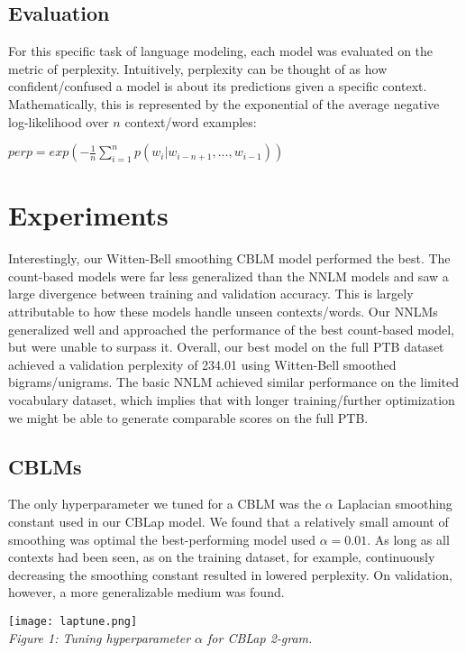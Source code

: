 \documentclass[11pt]{article}
\begin{document}
\subsection{Evaluation}
For this specific task of language modeling, each model was evaluated on the metric of perplexity. Intuitively, perplexity can be thought of as how confident/confused a model is about its predictions given a specific context. Mathematically, this is represented by the exponential of the average negative log-likelihood over $n$ context/word examples:
\begin{center}
    $perp = exp(-\frac{1}{n}\sum_{i=1}^{n} p(w_{\scriptscriptstyle i}|w_{\scriptscriptstyle i-n+1},...,w_{\scriptscriptstyle i-1}))$
\end{center}

\section{Experiments}

Interestingly, our Witten-Bell smoothing CBLM model performed the best. The count-based models were far less generalized than the NNLM models and saw a large divergence between training and validation accuracy. This is largely attributable to how these models handle unseen contexts/words. Our NNLMs generalized well and approached the performance of the best count-based model, but were unable to surpass it. Overall, our best model on the full PTB dataset achieved a validation perplexity of 234.01 using Witten-Bell smoothed bigrams/unigrams. The basic NNLM achieved similar performance on the limited vocabulary dataset, which implies that with longer training/further optimization we might be able to generate comparable scores on the full PTB.

\subsection{CBLMs}
The only hyperparameter we tuned for a CBLM was the $\alpha$ Laplacian smoothing constant used in our CBLap model. We found that a relatively small amount of smoothing was optimal \textemdash  the best-performing model used $\alpha = 0.01$. As long as all contexts had been seen, as on the training dataset, for example, continuously decreasing the smoothing constant resulted in lowered perplexity. On validation, however, a more generalizable medium was found.

\begin{center}
    \texttt{[image: laptune.png]}\\
    \textit{Figure 1: Tuning hyperparameter $\alpha$ for CBLap 2-gram.}
\end{center}
\end{document}
